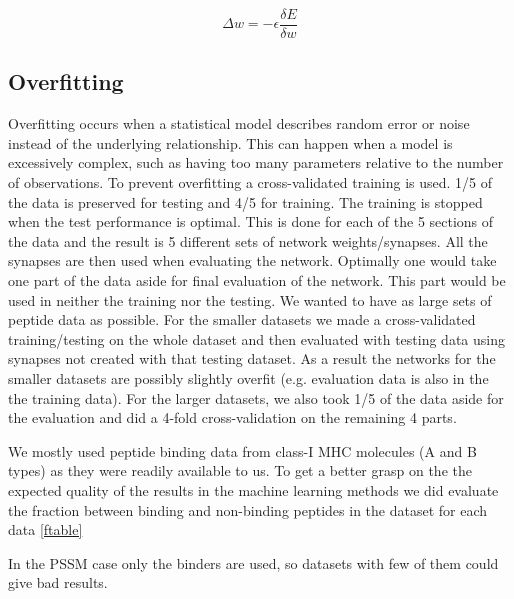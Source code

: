 \begin{equation}
\Delta w = -\epsilon \frac{\delta E}{\delta w}
\end{equation}

\subsection*{Overfitting}
Overfitting occurs when a statistical model describes random error or noise instead of the underlying relationship.
This can happen when a model is excessively complex, such as having too many parameters relative to the number of observations.
To prevent overfitting a cross-validated training is used. 1/5 of the data is preserved for testing and 4/5 for training. 
The training is stopped when the test performance is optimal. This is done for each of the 5 sections of the data and the result is 5 different sets of network weights/synapses.
All the synapses are then used when evaluating the network.
Optimally one would take one part of the data aside for final evaluation of the network. This part would be used in neither the training nor the testing.
We wanted to have as large sets of peptide data as possible. For the smaller datasets we made a cross-validated training/testing on the whole dataset and then evaluated with testing data using synapses not created with that testing dataset.
As a result the networks for the smaller datasets are possibly slightly overfit (e.g. evaluation data is also in the the training data).
For the larger datasets, we also took 1/5 of the data aside for the evaluation and did a 4-fold cross-validation on the remaining 4 parts.

We mostly used peptide binding data from class-I MHC molecules (A and B types) as they were readily available to us.
To get a better grasp on the the expected quality of the results in the machine learning methods we did evaluate the fraction between binding and non-binding peptides in the dataset for each data {\ref{ftable}}



In the PSSM case only the binders are used, so datasets with few of them could give bad results.

